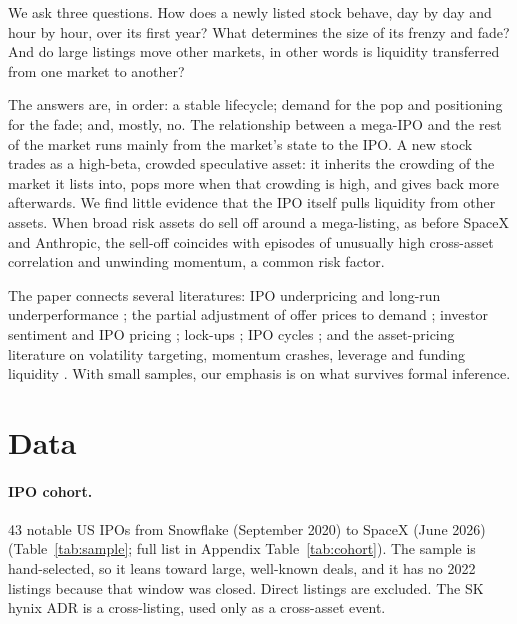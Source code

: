 \documentclass[11pt]{article}
\begin{document}
We ask three questions. How does a newly listed stock behave, day by day and hour by hour, over its first year? What determines the size of its frenzy and fade? And do large listings move other markets, in other words is liquidity transferred from one market to another?

The answers are, in order: a stable lifecycle; demand for the pop and positioning for the fade; and, mostly, no. The relationship between a mega-IPO and the rest of the market runs mainly from the market's state to the IPO. A new stock trades as a high-beta, crowded speculative asset: it inherits the crowding of the market it lists into, pops more when that crowding is high, and gives back more afterwards. We find little evidence that the IPO itself pulls liquidity from other assets. When broad risk assets do sell off around a mega-listing, as before SpaceX and Anthropic, the sell-off coincides with episodes of unusually high cross-asset correlation and unwinding momentum, a common risk factor.

The paper connects several literatures: IPO underpricing and long-run underperformance \citep{ritter1991,loughran1995,ljungqvist2007}; the partial adjustment of offer prices to demand \citep{hanley1993}; investor sentiment and IPO pricing \citep{derrien2005,cornelli2006,ljungqvist2006,baker2006,baker2007}; lock-ups \citep{field2001,aggarwal2002}; IPO cycles \citep{lowry2002}; and the asset-pricing literature on volatility targeting, momentum crashes, leverage and funding liquidity \citep{moreira2017,daniel2016,adrian2010,brunnermeier2009}. With small samples, our emphasis is on what survives formal inference.

\section{Data}

\paragraph{IPO cohort.} 43 notable US IPOs from Snowflake (September 2020) to SpaceX (June 2026) (Table~\ref{tab:sample}; full list in Appendix Table~\ref{tab:cohort}). The sample is hand-selected, so it leans toward large, well-known deals, and it has no 2022 listings because that window was closed. Direct listings are excluded. The SK hynix ADR is a cross-listing, used only as a cross-asset event.
\end{document}
